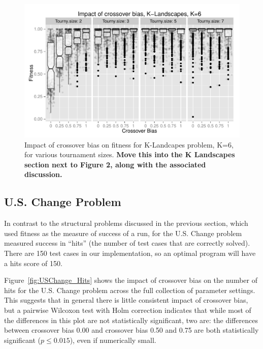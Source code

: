 \documentclass{sig-alternate}
\begin{document}
\begin{figure}
\centering
\includegraphics[width=0.45 \textwidth]{Plots/KLandscapes6_XO_bias_impact_facets.pdf}
\caption{Impact of crossover bias on fitness for K-Landcapes problem, K=6, for various tournament sizes. \textbf{Move this into the K Landscapes section next to Figure 2, along with the associated discussion.}}
\label{fig:KLandscapes6_XO_bias_impact_facets}
\end{figure}

%
%
%
%

\subsection{U.S. Change Problem}

In contrast to the structural problems discussed in the previous section, which used fitness as the measure of success
of a run, for the U.S. Change problem measured success in ``hits'' (the number of test cases that are correctly
solved). There are 150 test cases in our implementation, so an optimal program will have a hits score of 150.

Figure~\ref{fig:USChange_Hits} shows the impact of crossover bias on the number of hits for the U.S. Change problem
across the full collection of parameter settings. This suggests that in general there is little consistent impact of
crossover bias, but a pairwise Wilcoxon test with Holm correction indicates that while most of the differences in this
plot are not statistically significant, two are: the differences between crossover bias 0.00 and crossover bias 0.50 and
0.75 are both statistically significant ($p \leq 0.015$), even if numerically small.
\end{document}
